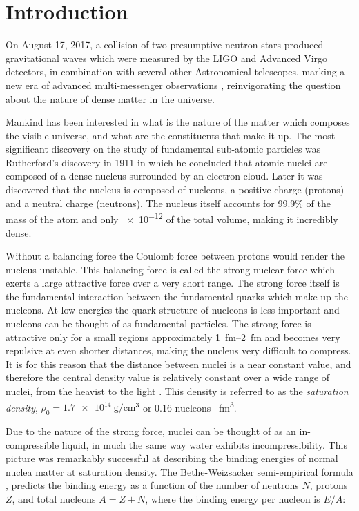 \chapter{Introduction}
On August 17, 2017, a collision of two presumptive neutron stars produced gravitational waves which were measured by the LIGO and Advanced Virgo detectors, in combination with several other Astronomical telescopes, marking a new era of advanced multi-messenger observations \cite{ns_2017}, reinvigorating the question about the nature of dense matter in the universe.

Mankind has been interested in what is the nature of the matter which composes the visible universe, and what are the constituents that make it up. The most significant discovery on the study of fundamental sub-atomic particles was Rutherford's discovery in 1911 in which he concluded that atomic nuclei are composed of a dense nucleus surrounded by an electron cloud. Later it was discovered that the nucleus is composed of nucleons, a positive charge (protons) and a neutral charge (neutrons). The nucleus itself accounts for 99.9\% of the mass of the atom and only \num{e-12} of the total volume, making it incredibly dense. 

Without a balancing force the Coulomb force between protons would render the nucleus unstable. This balancing force is called the strong nuclear force which exerts a large attractive force over a very short range. The strong force itself is the fundamental interaction between the fundamental quarks which make up the nucleons. At low energies the quark structure of nucleons is less important and nucleons can be thought of as fundamental particles. The strong force is attractive only for a small regions approximately \SIrange{1}{2}{\femto\metre} and becomes very repulsive at even shorter distances, making the nucleus very difficult to compress. It is for this reason that the distance between nuclei is a near constant value, and therefore the central density value is relatively constant over a wide range of nuclei, from the heavist to the light \cite{krane}. This density is referred to as the  \emph{saturation density}, $\rho_0 = \SI{1.7e14}{\gram\per\centi\metre\cubed}$ or \num{0.16} nucleons \si{\per\femto\metre\cubed}.  

Due to the nature of the strong force, nuclei can be thought of as an in-compressible liquid, in much the same way water exhibits incompressibility. This picture was remarkably successful at describing the binding energies of normal nuclea matter at saturation density. The Bethe-Weizsacker semi-empirical formula \cite{awayforward}, predicts the binding energy as a function of the number of neutrons $N$, protons $Z$, and total nucleons $A = Z + N$, where the binding energy per nucleon is $E/A$:
 
